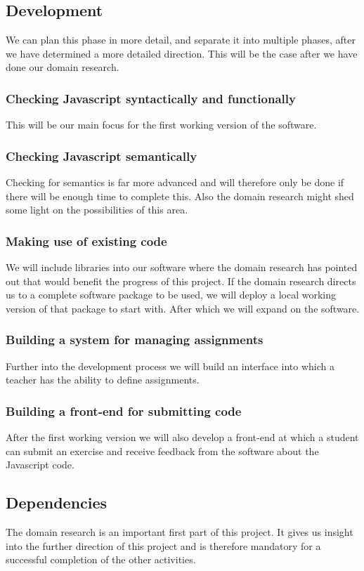 \documentclass{article}
\begin{document}
\begin{itemize}
\subsection{Development}
We can plan this phase in more detail, and separate it into multiple phases, after we have determined a more detailed direction. This will be the case after we have done our domain research.

\subsubsection{Checking Javascript syntactically and functionally}
This will be our main focus for the first working version of the software.
\subsubsection{Checking Javascript semantically}
Checking for semantics is far more advanced and will therefore only be done if there will be enough time to complete this. Also the domain research might shed some light on the possibilities of this area.
\subsubsection{Making use of existing code}
We will include libraries into our software where the domain research has pointed out that would benefit the progress of this project. If the domain research directs us to a complete software package to be used, we will deploy a local working version of that package to start with. After which we will expand on the software.
\subsubsection{Building a system for managing assignments}
Further into the development process we will build an interface into which a teacher has the ability to define assignments.
\subsubsection{Building a front-end for submitting code}
After the first working version we will also develop a front-end at which a student can submit an exercise and receive feedback from the software about the Javascript code.
\subsection{Dependencies}
The domain research is an important first part of this project. It gives us insight into the further direction of this project and is therefore mandatory for a successful completion of the other activities.


\end{itemize}
\end{document}
